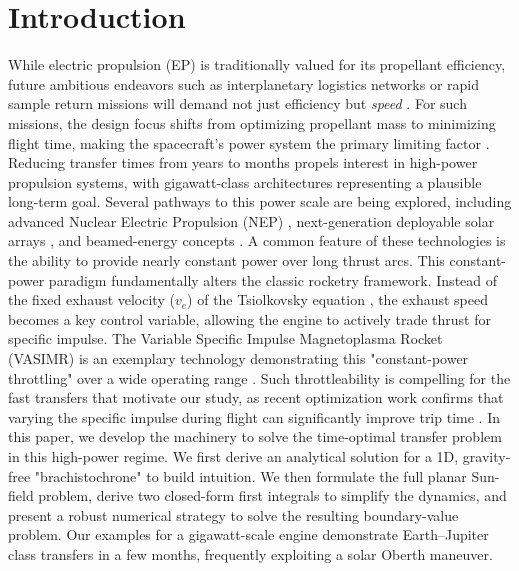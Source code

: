\documentclass[journal, a4paper]{IEEEtran}
\begin{document}
\section{Introduction}
While electric propulsion (EP) is traditionally valued for its propellant efficiency, future ambitious endeavors such as interplanetary logistics networks or rapid sample return missions will demand not just efficiency but \emph{speed} \cite{Conway2010, PinoHowell2020, Fogel2020}. For such missions, the design focus shifts from optimizing propellant mass to minimizing flight time, making the spacecraft's power system the primary limiting factor \cite{Mazouffre2016}.
Reducing transfer times from years to months propels interest in high-power propulsion systems, with gigawatt-class architectures representing a plausible long-term goal. Several pathways to this power scale are being explored, including advanced Nuclear Electric Propulsion (NEP) \cite{Peakman2023, scott2019value}, next-generation deployable solar arrays \cite{ChangDiaz2019}, and beamed-energy concepts \cite{Sheerin2021}. A common feature of these technologies is the ability to provide nearly constant power over long thrust arcs.
This constant-power paradigm fundamentally alters the classic rocketry framework. Instead of the fixed exhaust velocity ($v_e$) of the Tsiolkovsky equation \cite{Tsiolkovsky1903}, the exhaust speed becomes a key control variable, allowing the engine to actively trade thrust for specific impulse. The Variable Specific Impulse Magnetoplasma Rocket (VASIMR) is an exemplary technology demonstrating this "constant-power throttling" over a wide operating range \cite{Bering2011}. Such throttleability is compelling for the fast transfers that motivate our study, as recent optimization work confirms that varying the specific impulse during flight can significantly improve trip time \cite{DiPasquale2024}.
In this paper, we develop the machinery to solve the time-optimal transfer problem in this high-power regime. We first derive an analytical solution for a 1D, gravity-free "brachistochrone" to build intuition. We then formulate the full planar Sun-field problem, derive two closed-form first integrals to simplify the dynamics, and present a robust numerical strategy to solve the resulting boundary-value problem. Our examples for a gigawatt-scale engine demonstrate Earth–Jupiter class transfers in a few months, frequently exploiting a solar Oberth maneuver.
\end{document}
